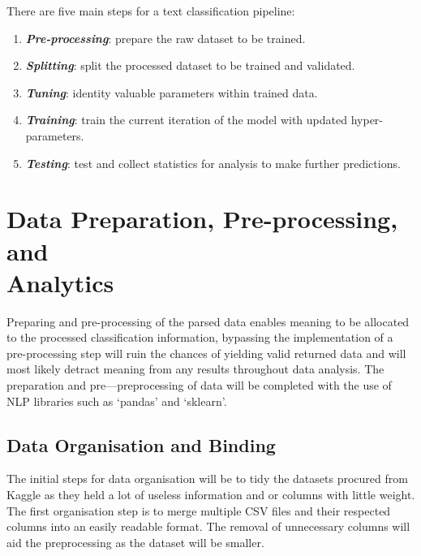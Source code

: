 There are five main steps for a text classification pipeline:

\begin{enumerate}
    \item \textbf{\textit{Pre-processing}}: prepare the raw dataset to be trained.
    \item \textbf{\textit{Splitting}}: split the processed dataset to be trained and validated.
    \item \textbf{\textit{Tuning}}: identity valuable parameters within trained data.
    \item \textbf{\textit{Training}}: train the current iteration of the model with updated hyper-parameters.
    \item \textbf{\textit{Testing}}: test and collect statistics for analysis to make further predictions.
\end{enumerate} \newpage

\section[Data Preparation, Pre-processing, and Analytics]{\texorpdfstring{Data Preparation, Pre-processing, and \\ Analytics}{Data Preparation, Pre-processing, and Analytics}}

Preparing and pre-processing of the parsed data enables meaning to be allocated to the processed classification information, bypassing the implementation of a pre-processing step will ruin the chances of yielding valid returned data and will most likely detract meaning from any results throughout data analysis. The preparation and pre---preprocessing of data will be completed with the use of NLP libraries such as `pandas' and `sklearn'.

\subsection{Data Organisation and Binding}

The initial steps for data organisation will be to tidy the datasets procured from Kaggle as they held a lot of useless information and or columns with little weight. The first organisation step is to merge multiple CSV files and their respected columns into an easily readable format. The removal of unnecessary columns will aid the preprocessing as the dataset will be smaller.

